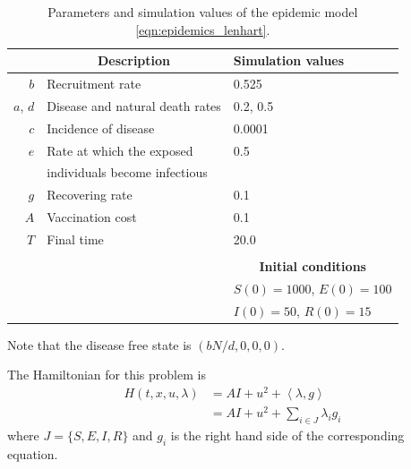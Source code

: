 \begin{table}[htb]
  \begin{center}
    \begin{tabular}{rll}
      \toprule
        & \multicolumn{1}{c}{\textbf{Description}} 
        & \textbf{Simulation values}
        \\
      \midrule
        $b$
          & Recruitment rate
          & \num{0.525}
        \\
        $a$, $d$ 
          & Disease and natural death rates
          & \num{0.2}, \num{0.5}
        \\
        $c$
          & Incidence of disease
          & \num{0.0001}
        \\
        $e$
          & Rate at which the exposed 
          & \num{0.5}
          \\
          & individuals become infectious
        \\
        $g$
          & Recovering rate
          & \num{0.1}
        \\
        $A$
          & Vaccination cost
          & \num{0.1}
        \\
        $T$
          & Final time
          & \num{20.0}
        \\
        \\
        && 
        \multicolumn{1}{c}{
          \textbf{Initial conditions}
        }
        \\
        \cmidrule{3-3}
          &&
            $S(0) = \num{1000}$, $E(0) = \num{100}$
          \\
          &&
            $I(0) = \num{50}$, $R(0) = \num{15}$
        \\
      \bottomrule
    \end{tabular}
    \caption{Parameters and simulation values of the epidemic model
      \eqref{eqn:epidemics_lenhart}.}
    \label{tbl:epidemics_lenhart}
  \end{center}
\end{table}

 Note that the disease free state is 
$(bN/d,0,0,0)$.

The Hamiltonian for this problem is
\begin{align*}
    H(t,x,u,\lambda) &= AI + u^{2} + \left< \lambda , g \right> \\
                     &= AI + u^{2} + \sum_{i \in J} \lambda_{i}g_{i}
\end{align*}
where $J = \{S, E, I, R\}$ and $g_i$ is the right hand side of the corresponding
equation.

